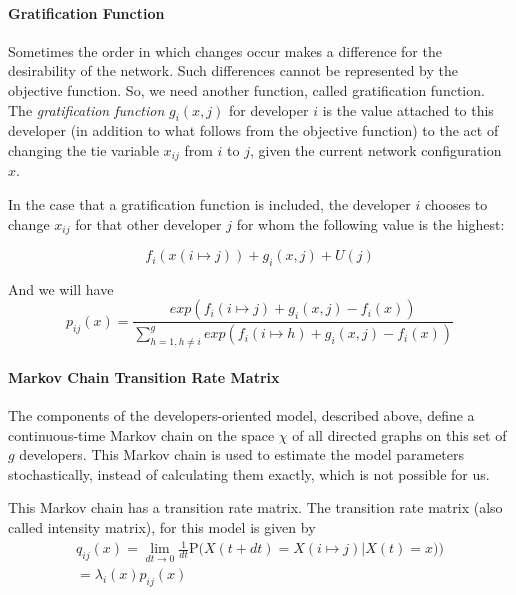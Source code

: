 \documentclass[12pt]{report}
\begin{document}
\paragraph*{Gratification Function}
Sometimes the order in which changes occur makes a difference for the desirability of the network. Such differences cannot be represented by the objective function. So, we need another function, called gratification function. \\

The \textit{gratification function} $g_i(x,j)$ for developer $i$ is the value attached to this developer (in addition to what follows from the objective function) to the act of changing the tie variable $x_{ij}$ from $i$ to $j$, given the current network configuration $x$. 

In the case that a gratification function is included, the developer $i$ chooses to change $x_{ij}$ for that other developer $j$ for whom the following value \cite{Snijders2004} is the highest:

\begin{equation}
f_i(x(i \mapsto j)) + g_i(x, j) + U(j)
\end{equation} 

And we will have 
\begin{equation}
\label{ObjectiveFunctionWithGratification}
p_{ij}(x) = \frac{exp(f_i(i \mapsto j) + g_i(x, j) - f_i(x))}{\sum_{h=1, h \neq i}^{g} exp(f_i(i \mapsto h) + g_i(x, j) - f_i(x))}
\end{equation}

\paragraph*{Markov Chain Transition Rate Matrix}
The components of the developers-oriented model, described above, define a continuous-time Markov chain on the space $\chi$ of all directed graphs on this set of $g$ developers. This Markov chain is used to estimate the model parameters stochastically, instead of calculating them exactly, which is not possible for us.

This Markov chain has a transition rate matrix. The transition rate matrix (also called intensity matrix), for this model is given by 
\begin{multline}
\label{intensityMatrix}
q_{ij}(x) = \lim_{dt \to 0} \frac{1}{dt} \mathrm {P} \big({X(t + dt) = X(i \mapsto j) | X(t) = x)}\big) \\ = \lambda_i(x) p_{ij}(x)
\end{multline}
\end{document}
